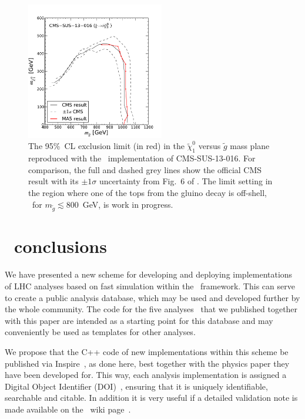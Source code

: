 \begin{figure}[!h]\centering
\includegraphics[width=6cm]{figures/madanalysis5/cms-016-limit.pdf}
\caption{The 95\%~CL exclusion limit (in red) in the $\tilde\chi^0_1$ versus $\tilde g$ mass plane reproduced 
with the \ma\ implementation  \cite{MA5-CMS-SUS-13-016}  of CMS-SUS-13-016. For comparison, the full and dashed grey lines show the official CMS result with its $\pm1\sigma$ uncertainty from Fig.~6 of \cite{CMS:2013ija}. 
The limit setting in the region where one of the tops from the gluino decay is off-shell, \ie\ for $m_{\tilde g}\lesssim 800$~GeV, is work in progress.} 
\label{fig:cms-016-limit}
\end{figure}



\section{\ma\ conclusions}\label{sec:conclusions}


We have presented a new scheme for developing and deploying implementations of LHC analyses 
based on fast simulation within the \ma\ framework. This can serve to create a public analysis database,  
which may be used and developed further by the whole community.  
The code for the five analyses~\cite{MA5-CMS-SUS-13-011,MA5-CMS-SUS-13-012,MA5-CMS-SUS-13-016,MA5-ATLAS-SUSY-2013-05,MA5-ATLAS-SUSY-2013-11} 
that we published together with this paper are intended as a starting point 
for this database and may conveniently be used as templates for other analyses.  

We propose that the C++ code of new implementations within this scheme be published 
via {\sc Inspire}~\cite{inspire}, as done here,  
best together with the physics paper they have been developed for. 
This way, each analysis implementation is assigned a 
Digital Object Identifier (DOI)~\cite{doi}, ensuring that it is uniquely identifiable, searchable and citable. 
In addition it is very useful if a detailed validation note is made available on the  \ma\ wiki page~\cite{ma5wiki}. 

